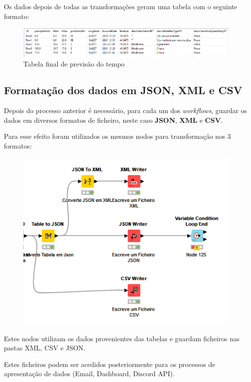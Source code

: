 Os dados depois de todas as transformações geram uma tabela com o seguinte formato:

\begin{figure}[H]
    \centering
    \includegraphics[scale=0.6]{imagens/TabelaFinalPrev.png}
    \caption{Tabela final de previsão do tempo}
\end{figure}

\newpage

\subsection*{Formatação dos dados em JSON, XML e CSV}
Depois do processo anterior é necessário, para cada um dos \textit{workflows}, guardar os dados em diversos formatos de ficheiro, neste caso \textbf{JSON}, \textbf{XML} e \textbf{CSV}.

Para esse efeito foram utilizados os mesmos nodos para transformação nos 3 formatos:

\begin{figure}[H]
    \centering
    \includegraphics[scale=0.7]{imagens/FileTrans.png}
\end{figure}

Estes nodos utilizam os dados provenientes das tabelas e guardam ficheiros nas pastas XML, CSV e JSON.

Estes ficheiros podem ser acedidos posteriormente para os processos de apresentação de dados (Email, Dashboard, Discord API).

